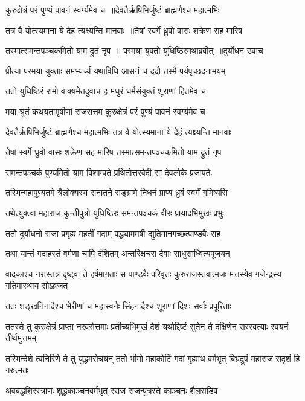 कुरुक्षेत्रं परं पुण्यं पावनं स्वर्ग्यमेव च ॥देवतैर्ऋषिभिर्जुष्टं ब्राह्मणैश्च महात्मभिः

तत्र वै योत्स्यमाना ये देहं त्यक्ष्यन्ति मानवाः ॥तेषां स्वर्गे ध्रुवो वासः शक्रेण सह मारिष

तस्मात्समन्तपञ्चकमितो याम द्रुतं नृप ॥ परमया युक्तो युधिष्ठिरमथाब्रवीत् ॥दुर्योधन उवाच


\twolineshloka
{प्रीत्या परमया युक्ताः समभ्यर्च्य यथाविधि}
{आसनं च ददौ तस्मै पर्यपृच्छदनामयम्}


\twolineshloka
{ततो युधिष्ठिरं रामो वाक्यमेतदुवाच ह}
{मधुरं धर्मसंयुक्तं शूराणां हितमेव च}


\twolineshloka
{मया श्रुतं कथयतामृषीणां राजसत्तम}
{कुरुक्षेत्रं परं पुण्यं पावनं स्वर्ग्यमेव च}


\twolineshloka
{देवतैर्ऋषिभिर्जुष्टं ब्राह्मणैश्च महात्मभिः}
{तत्र वै योत्स्यमाना ये देहं त्यक्ष्यन्ति मानवाः}


\twolineshloka
{तेषां स्वर्गे ध्रुवो वासः शक्रेण सह मारिष}
{तस्मात्समन्तपञ्चकमितो याम द्रुतं नृप}


\twolineshloka
{समन्तपञ्चकं पुण्यमितो याम विशाम्पते}
{प्रथितोत्तरवेदी सा देवलोके प्रजापतेः}


\twolineshloka
{तस्मिन्महापुण्यतमे त्रैलोक्यस्य सनातने}
{सङ्ग्रामे निधनं प्राप्य ध्रुवं स्वर्गं गमिष्यसि}


\twolineshloka
{तथेत्युक्त्वा महाराज कुन्तीपुत्रो युधिष्ठिरः}
{समन्तपञ्चकं वीरः प्रायादभिमुखः प्रभुः}


\twolineshloka
{ततो दुर्योधनो राजा प्रगृह्य महतीं गदाम्}
{पद्ध्याममर्षी द्युतिमानगच्छत्पाण्डवैः सह}


\twolineshloka
{तथा यान्तं गदाहस्तं वर्मणा चापि दंशितम्}
{अन्तरिक्षचरा देवाः साधुसाध्वित्यपूजयन्}


वादकाश्च नरास्तत्र दृष्ट्वा ते हर्षमागताः
\twolineshloka
{स पाण्डवैः परिवृतः कुरुराजस्तवात्मजः}
{मत्तस्येव गजेन्द्रस्य गतिमास्थाय सोऽव्रजत्}


\twolineshloka
{ततः शङ्खनिनादैश्च भेरीणां च महास्वनैः}
{सिंहनादैश्च शूराणां दिशः सर्वाः प्रपूरिताः}


\threelineshloka
{ततस्ते तु कुरुक्षेत्रं प्राप्ता नरवरोत्तमाः}
{प्रतीच्यभिमुखं देशं यथोद्दिष्टं सुतेन ते}
{दक्षिणेन सरस्वत्याः स्वयनं तीर्थमुत्तमम्}


तस्मिन्देशे त्वनिरिणे ते तु युद्धमरोचयन्
\twolineshloka
{ततो भीमो महाकोटिं गदां गृह्याथ वर्मभृत्}
{बिभ्रद्रूपं महाराज सदृशं हि गरुत्मतः}


\twolineshloka
{अवबद्धशिरस्त्राणः शुद्धकाञ्चनवर्मभृत्}
{रराज राजन्पुत्रस्ते काञ्चनः शैलराडिव}


